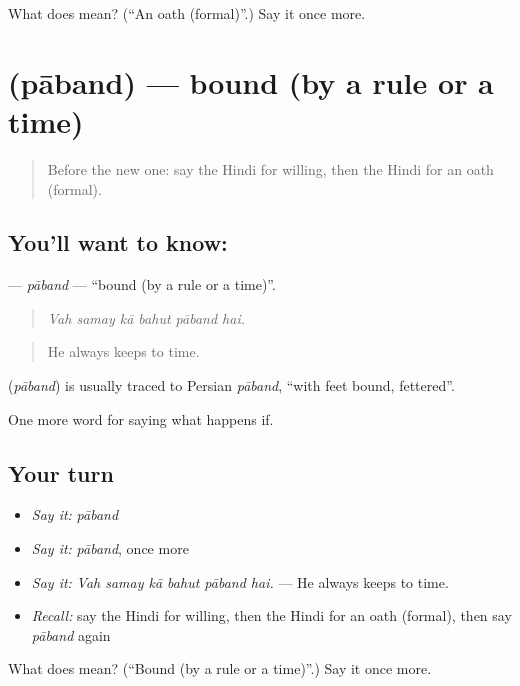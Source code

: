 \begin{tcolorbox}[breakable,colback=teal!4,colframe=teal!35!black,title={Before you move on}]
What does  mean? (\textquotedblleft{}An oath (formal)\textquotedblright{}.) Say it once more.
\end{tcolorbox}
\section[\texorpdfstring{\hi{पाबंद} (pāband)}{पाबंद (pāband)}]{ (pāband) — bound (by a rule or a time)}

\label{lesson:HI-C543-paband}



\begin{quote}
Before the new one: say the Hindi for willing, then the Hindi for an oath (formal).
\end{quote}

\subsection*{You'll want to know: }
\textbf{} — \emph{pāband} — \textquotedblleft{}bound (by a rule or a time)\textquotedblright{}.

\begin{quote}
     
\end{quote}

\begin{quote}
\emph{Vah samay kā bahut pāband hai.}
\end{quote}

\begin{quote}
He always keeps to time.
\end{quote}

\begin{cousinweb}
\textbf{} (\emph{pāband}) is usually traced to Persian \emph{pāband}, \textquotedblleft{}with feet bound, fettered\textquotedblright{}.
\end{cousinweb}

\begin{grammarlens}[title={What you've built}]
One more word for saying what happens if.
\end{grammarlens}

\subsection*{Your turn}
\begin{itemize}
\raggedright
  \item \emph{Say it:} \emph{pāband}
  \item \emph{Say it:} \emph{pāband}, once more
  \item \emph{Say it:} \emph{Vah samay kā bahut pāband hai.} — He always keeps to time.
  \item \emph{Recall:} say the Hindi for willing, then the Hindi for an oath (formal), then say \emph{pāband} again
\end{itemize}

\begin{tcolorbox}[breakable,colback=teal!4,colframe=teal!35!black,title={Before you move on}]
What does  mean? (\textquotedblleft{}Bound (by a rule or a time)\textquotedblright{}.) Say it once more.
\end{tcolorbox}
